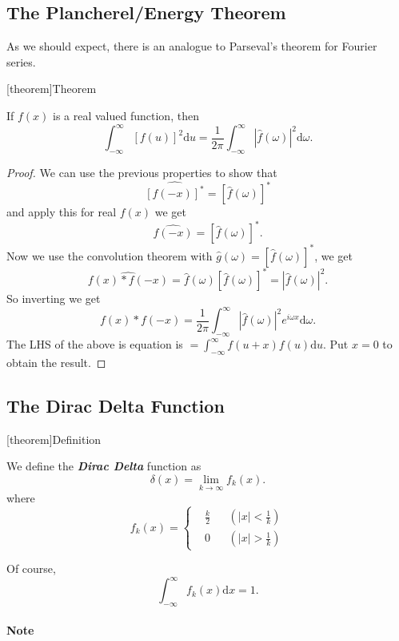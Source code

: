 \documentclass[12pt]{report}
\theoremstyle{definition}
\begin{document}
\subsection{The Plancherel/Energy Theorem}

As we should expect, there is an analogue to Parseval's theorem for Fourier series.

[theorem]{Theorem}
\begin{Plancherel Theorem}
    If $f(x)$ is a real valued function, then\[
        \int_{-\infty}^{\infty} {[f(u)]}^{2}\mathrm{d}u
        = \frac{1}{2\pi}\int_{-\infty}^{\infty} {|\hat{f}(\omega)|}^{2}\mathrm{d}\omega.
    \]
    
\end{Plancherel Theorem}

\begin{proof}
We can use the previous properties to show that\[
    \widehat{{[f(-x)]}^{*}} = {[\hat{f}(\omega)]}^{*}
\]and apply this for real $f(x)$ we get\[
\widehat{f(-x)} = {[\hat{f}(\omega)]}^{*}.
\]Now we use the convolution theorem with $\hat{g}(\omega) = {[\hat{f}(\omega)]}^{*}$, we get\[
\widehat{f(x)*f(-x)} = \hat{f}(\omega){[\hat{f}(\omega)]}^{*} = {|\hat{f}(\omega)|}^{2}.
\]So inverting we get\[
f(x)*f(-x) = \frac{1}{2\pi}\int_{-\infty}^{\infty} {|\hat{f}(\omega)|}^{2}e^{i\omega x}\mathrm{d}\omega.
\]
The LHS of the above is equation is $=\int_{-\infty}^{\infty} f(u+x)f(u)\mathrm{d}u$.
Put $x = 0$ to obtain the result.
\end{proof} 

\subsection{The Dirac Delta Function}

[theorem]{Definition}
\begin{Dirac Delta Function}
We define the \textbf{\emph{Dirac Delta}} function as\[
    \delta(x) = \lim_{k\rightarrow{}\infty}f_k(x).
\]where\[
    f_k(x) = \left\{\begin{align*}
        & \frac{k}{2} && (|x|<\frac{1}{k}) \\
        & 0 && (|x|>\frac{1}{k})
    \end{align*} 
\]
\end{Dirac Delta Function}

Of course,\[
\int_{-\infty}^{\infty} f_k(x)\mathrm{d}x = 1.
\]

\paragraph{Note}
\end{document}
